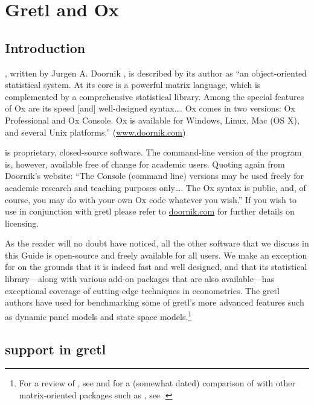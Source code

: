 \chapter{Gretl and Ox}
\label{chap:gretlOx}

\section{Introduction}
\label{Ox-intro}

, written by Jurgen A. Doornik \citep[see][]{doornik07}, is
described by its author as ``an object-oriented statistical system. At
its core is a powerful matrix language, which is complemented by a
comprehensive statistical library. Among the special features of Ox
are its speed [and] well-designed syntax\dots{}.  Ox comes in two
versions: Ox Professional and Ox Console. Ox is available for Windows,
Linux, Mac (OS X), and several Unix platforms.''
(\url{www.doornik.com})

 is proprietary, closed-source software.  The command-line
version of the program is, however, available free of change for
academic users.  Quoting again from Doornik's website: ``The
Console (command line) versions may be used freely for academic
research and teaching purposes only\dots{}. The Ox syntax is public,
and, of course, you may do with your own Ox code whatever you wish.''
If you wish to use  in conjunction with gretl please
refer to \url{doornik.com} for further details on licensing.

As the reader will no doubt have noticed, all the other software that
we discuss in this Guide is open-source and freely available for all
users.  We make an exception for  on the grounds that it is
indeed fast and well designed, and that its statistical
library---along with various add-on packages that are also
available---has exceptional coverage of cutting-edge techniques in
econometrics.  The gretl authors have used  for benchmarking
some of gretl's more advanced features such as dynamic panel models
and state space models.\footnote{For a review of , see
  \cite{cribari-neto03} and for a (somewhat dated) comparison of
   with other matrix-oriented packages such as ,
  see \cite{steinhaus99}.}

\section{ support in gretl}
\label{sec:Ox-support}

